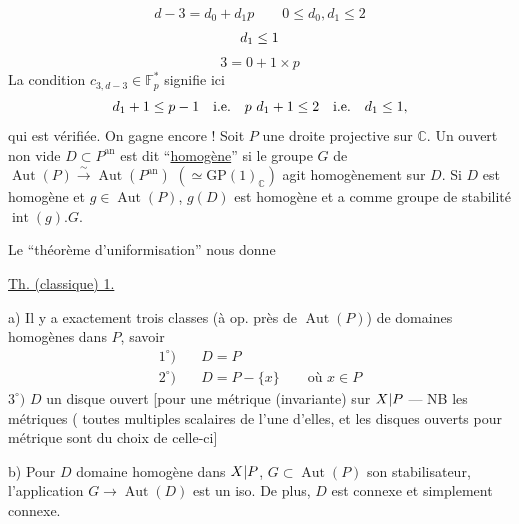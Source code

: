 \[
d-3=d_0+d_1p\qquad0\leq d_0,d_1\leq2
\]
\[{d_1\leq1}\]
\[3=0+1\times p\]
La condition $c_{3,d-3}\in\mathbb F_p^*$ signifie ici
\[
d_1+1\leq p-1\quad\text{i.e.}\quad\deleted{\unsure{p}}\ d_1+1\leq2\quad\text{i.e.}\quad d_1\leq1,
\]
qui est vérifiée. On gagne encore !
Soit $P$ une droite projective sur $\mathbb C$. Un ouvert non vide $D\subset P^{\mathrm{an}}$ est dit ``\uline{homogène}'' si le groupe $G$ de $\operatorname{Aut}(P)\xrightarrow{\sim}\operatorname{Aut}(P^{\mathrm{an}})$ $(\simeq\mathrm{GP}(1)_{\mathbb C})$ agit homogènement sur $D$. Si $D$ est homogène et $g\in\operatorname{Aut}(P)$, $g(D)$ est homogène et a comme groupe de stabilité $\operatorname{int}(g).G$.

Le ``théorème d'uniformisation'' nous donne

\uline{Th. (classique) 1.}

a) Il y a exactement trois classes (à op. près de $\operatorname{Aut}(P)$) de domaines homogènes dans $P$, savoir
\[
\begin{aligned}
1^\circ)\quad&D=P\\
2^\circ)\quad&D=P-\{x\}\qquad\text{où }x\in P
\end{aligned}
\]
$3^\circ)$ $D$ un disque ouvert [pour une métrique  (invariante) sur ${X|P}$ --- NB les métriques  ( toutes multiples scalaires de l'une d'elles, et les disques ouverts pour  métrique sont  du choix de celle-ci]

b) Pour $D$ domaine homogène dans ${X|P}$, $G\subset\operatorname{Aut}(P)$ son stabilisateur, l'application $G\longrightarrow\operatorname{Aut}(D)$ est un iso. De plus, $D$ est connexe et simplement connexe.

